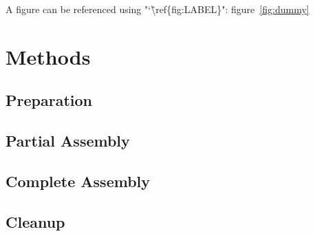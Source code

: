 \documentclass[letterpaper,12pt]{article}
\begin{document}
A figure can be referenced using "\char`\~ \textbackslash ref\{fig:LABEL\}": figure~\ref{fig:dummy}



\section{Methods}
\subsection{Preparation}


\subsection{Partial Assembly}

\subsection{Complete Assembly}

	
\subsection{Cleanup}
\end{document}

